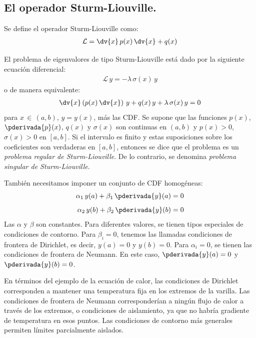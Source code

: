 \subsection{El operador Sturm-Liouville.}

Se define el operador Sturm-Liouville como:
\begin{align}
\mathcal{L} = \dv{x} \, p(x) \, \dv{x} + q(x)
\label{eq:ecuacion_04_02}
\end{align}

El problema de eigenvalores de tipo Sturm-Liouville está dado por la siguiente ecuación diferencial:
\begin{align*}
\mathcal{L} \, y = - \lambda \, \sigma(x) \, y
\end{align*}
o de manera equivalente:
\begin{align}
\dv{x} \left( p(x) \, \dv{x} \right) \, y + q(x) \, y + \lambda \, \sigma (x) \, y = 0
\label{eq:ecuacion_04_03}
\end{align}
para $x \, \in \, (a, b)$, $y = y (x)$, más las CDF. Se supone que las funciones $p (x)$, $\pderivada{p} (x)$, $q (x)$ y $\sigma (x)$ son continuas en $(a, b)$ y $p (x) > 0$, $\sigma (x) > 0$ en $[a , b]$. Si el intervalo es finito y estas suposiciones sobre los coeficientes son verdaderas en $[a, b]$, entonces se dice que el problema es un \emph{problema regular de Sturm-Liouville}. De lo contrario, se denomina \emph{problema singular de Sturm-Liouville}.
\par
También necesitamos imponer un conjunto de CDF homogéneas:
\begin{align}
\begin{aligned}
\alpha_{1} \, y(a) + \beta_{1} \, \pderivada{y} (a) &= 0 \\[0.5em]
\alpha_{2} \, y(b) + \beta_{2} \, \pderivada{y} (b) &= 0
\end{aligned}
\label{eq:ecuacion_04_04}
\end{align}
Las $\alpha$ y $\beta$ son constantes. Para diferentes valores, se tienen tipos especiales de condiciones de contorno. Para $\beta_{i} = 0$, tenemos las llamadas condiciones de frontera de Dirichlet, es decir, $y (a) = 0$ y $y (b) = 0$. Para $\alpha_{i} = 0$, se tienen las condiciones de frontera de Neumann. En este caso, $\pderivada{y} (a) = 0$ y $\pderivada{y} (b) = 0$.
\par
En términos del ejemplo de la ecuación de calor, las condiciones de Dirichlet corresponden a mantener una temperatura fija en los extremos de la varilla. Las condiciones de frontera de Neumann corresponderían a ningún flujo de calor a través de los extremos, o condiciones de aislamiento, ya que no habría gradiente de temperatura en esos puntos. Las condiciones de contorno más generales permiten límites parcialmente aislados.
